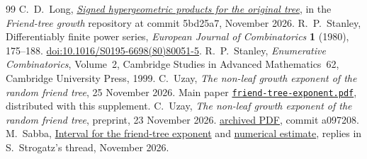 \documentclass[11pt]{article}
\newcommand{\proofsrc}[2]{\href{https://github.com/uzay-eth/friend-tree-exponent/blob/a0972085ad72ad5685ae7b424988648d1965e73c/#1}{#2}}
\theoremstyle{remark}
\numberwithin{equation}{section}
\begin{document}
\begin{thebibliography}{99}
 C.~D.~Long, \href{https://github.com/long-mathematics/friend-tree-growth/blob/5bd25a7d506cb64a8444b86334ab531d295f6c78/README.md#signed-hypergeometric-products-for-the-original-tree}{\emph{Signed hypergeometric products for the original tree}}, in the \emph{Friend-tree growth} repository at commit 5bd25a7, November 2026.
 R.~P.~Stanley, Differentiably finite power series, \emph{European Journal of Combinatorics} \textbf{1} (1980), 175--188. \href{https://doi.org/10.1016/S0195-6698(80)80051-5}{doi:10.1016/S0195-6698(80)80051-5}.
 R.~P.~Stanley, \emph{Enumerative Combinatorics}, Volume~2, Cambridge Studies in Advanced Mathematics~62, Cambridge University Press, 1999.
 C.~Uzay, \emph{The non-leaf growth exponent of the random friend tree}, 25 November 2026. Main paper \href{friend-tree-exponent.pdf}{\texttt{friend-tree-exponent.pdf}}, distributed with this supplement.
 C.~Uzay, \emph{The non-leaf growth exponent of the random friend tree}, preprint, 23 November 2026. \proofsrc{paper/friend-tree-exponent.pdf}{archived PDF}, commit a097208.
 M.~Sabba, \href{https://x.com/ma_sabba/status/2124768206141206762}{Interval for the friend-tree exponent} and \href{https://x.com/ma_sabba/status/2124791407667716208}{numerical estimate}, replies in S.~Strogatz's thread, November 2026.
\end{thebibliography}
\end{document}
